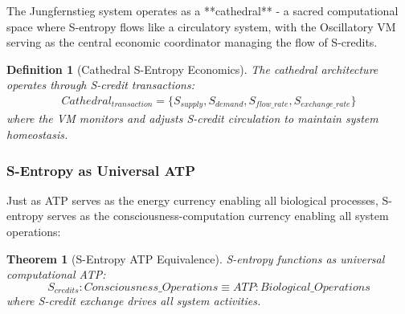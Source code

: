 \documentclass[12pt,a4paper]{article}
\newtheorem{theorem}{Theorem}
\newtheorem{definition}{Definition}
\begin{document}
The Jungfernstieg system operates as a **cathedral** - a sacred computational space where S-entropy flows like a circulatory system, with the Oscillatory VM serving as the central economic coordinator managing the flow of S-credits.

\begin{definition}[Cathedral S-Entropy Economics]
The cathedral architecture operates through S-credit transactions:
\begin{align}
Cathedral_{transaction} = \{S_{supply}, S_{demand}, S_{flow\_rate}, S_{exchange\_rate}\}
\end{align}
where the VM monitors and adjusts S-credit circulation to maintain system homeostasis.
\end{definition}


\subsubsection{S-Entropy as Universal ATP}

Just as ATP serves as the energy currency enabling all biological processes, S-entropy serves as the consciousness-computation currency enabling all system operations:

\begin{theorem}[S-Entropy ATP Equivalence]
S-entropy functions as universal computational ATP:
\begin{equation}
S_{credits} : Consciousness\_Operations \equiv ATP : Biological\_Operations
\end{equation}
where S-credit exchange drives all system activities.
\end{theorem}
\end{document}
